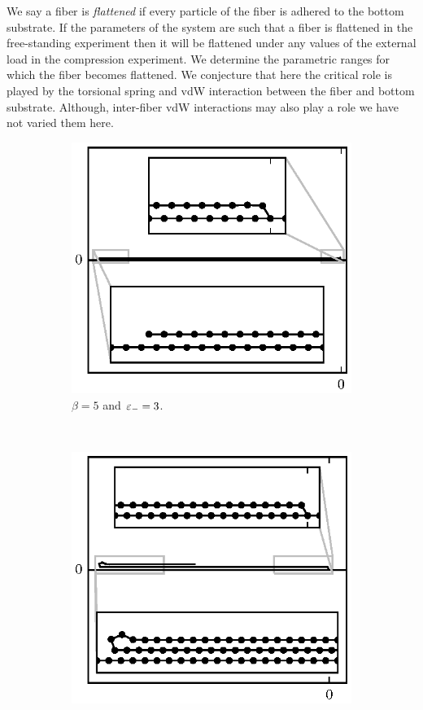 We say a fiber is \textit{flattened} if every particle of the fiber is adhered to the bottom substrate. If the parameters of the system are such that a fiber is flattened in the free-standing experiment then it will be flattened under any values of the external load in the compression experiment. We determine the parametric ranges for which the fiber becomes flattened. We conjecture that here the critical role is played by the torsional spring and vdW interaction between the fiber and bottom substrate. Although, inter-fiber vdW interactions may also play a role we have not varied them here.

	\begin{figure}[h!]
		\centering
		\begin{subfigure}{.5\textwidth}
			\centering
			\includegraphics{./fig/ch3/fs/b5_eb3.eps}
			\caption{$\beta=5$ and $\varepsilon_-=3$.\label{subfig:lazy}}
		\end{subfigure}%
		~
		\begin{subfigure}{.5\textwidth}
			\centering
			\includegraphics{./fig/ch3/fs/b2_eb6.eps}

\end{subfigure}
\end{figure}
